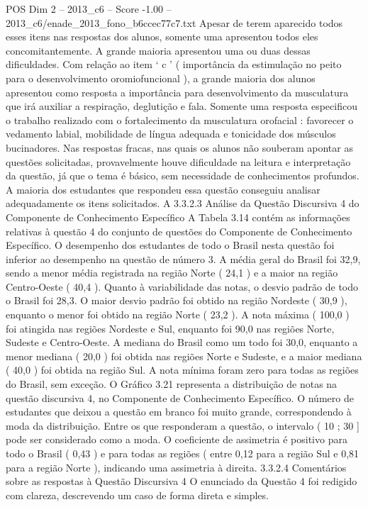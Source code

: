 \begin{textsample}{POS Dim 2 – 2013\_c6 – Score -1.00 – 2013\_c6/enade\_2013\_fono\_b6ccec77c7.txt}
Apesar de terem aparecido todos esses itens nas respostas dos alunos, somente uma apresentou todos eles concomitantemente.
A grande maioria apresentou uma ou duas dessas dificuldades.
Com relação ao item ‘ c ’ ( importância da estimulação no peito para o desenvolvimento oromiofuncional ), a grande maioria dos alunos apresentou como resposta a importância para desenvolvimento da musculatura que irá auxiliar a respiração, deglutição e fala.
Somente uma resposta especificou o trabalho realizado com o fortalecimento da musculatura orofacial : favorecer o vedamento labial, mobilidade de língua adequada e tonicidade dos músculos bucinadores.
Nas respostas fracas, nas quais os alunos não souberam apontar as questões solicitadas, provavelmente houve dificuldade na leitura e interpretação da questão, já que o tema é básico, sem necessidade de conhecimentos profundos.
A maioria dos estudantes que respondeu essa questão conseguiu analisar adequadamente os itens solicitados.
A 3.3.2.3 Análise da Questão Discursiva 4 do Componente de Conhecimento Específico A Tabela 3.14 contém as informações relativas à questão 4 do conjunto de questões do Componente de Conhecimento Específico.
O desempenho dos estudantes de todo o Brasil nesta questão foi inferior ao desempenho na questão de número 3.
A média geral do Brasil foi 32,9, sendo a menor média registrada na região Norte ( 24,1 ) e a maior na região Centro-Oeste ( 40,4 ).
Quanto à variabilidade das notas, o desvio padrão de todo o Brasil foi 28,3.
O maior desvio padrão foi obtido na região Nordeste ( 30,9 ), enquanto o menor foi obtido na região Norte ( 23,2 ).
A nota máxima ( 100,0 ) foi atingida nas regiões Nordeste e Sul, enquanto foi 90,0 nas regiões Norte, Sudeste e Centro-Oeste.
A mediana do Brasil como um todo foi 30,0, enquanto a menor mediana ( 20,0 ) foi obtida nas regiões Norte e Sudeste, e a maior mediana ( 40,0 ) foi obtida na região Sul.
A nota mínima foram zero para todas as regiões do Brasil, sem exceção.
O Gráfico 3.21 representa a distribuição de notas na questão discursiva 4, no Componente de Conhecimento Específico.
O número de estudantes que deixou a questão em branco foi muito grande, correspondendo à moda da distribuição.
Entre os que responderam a questão, o intervalo ( 10 ; 30 ] pode ser considerado como a moda.
O coeficiente de assimetria é positivo para todo o Brasil ( 0,43 ) e para todas as regiões ( entre 0,12 para a região Sul e 0,81 para a região Norte ), indicando uma assimetria à direita. 3.3.2.4 Comentários sobre as respostas à Questão Discursiva 4 O enunciado da Questão 4 foi redigido com clareza, descrevendo um caso de forma direta e simples.

\end{textsample}
